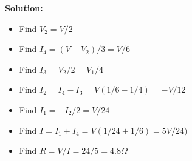 
 {\bf Solution:}
 
 \begin{itemize}
 \item Find $V_2=V/2$
 \item Find $I_4=(V-V_2)/3=V/6$
 \item Find $I_3=V_2/2=V_1/4$
 \item Find $I_2=I_4-I_3=V(1/6-1/4)=-V/12$
 \item Find $I_1=-I_2/2=V/24$
 \item Find $I=I_1+I_4=V(1/24+1/6)=5V/24)$
 \item Find $R=V/I=24/5=4.8\Omega$
 \end{itemize}
